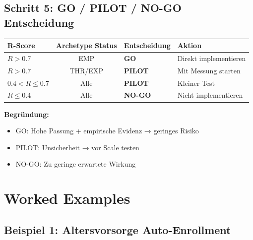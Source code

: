 \subsection{Schritt 5: GO / PILOT / NO-GO Entscheidung}

\begin{tcolorbox}[colback=green!5!white, colframe=green!75!black,
    title=\textbf{Entscheidungsregeln}]

\begin{center}
\renewcommand{\arraystretch}{1.5}
\begin{tabular}{@{}lcll@{}}
\toprule
\textbf{R-Score} & \textbf{Archetype Status} & \textbf{Entscheidung} & \textbf{Aktion} \\
\midrule
$R > 0.7$ & EMP & \cellcolor{green!30}\textbf{GO} & Direkt implementieren \\
$R > 0.7$ & THR/EXP & \cellcolor{yellow!30}\textbf{PILOT} & Mit Messung starten \\
$0.4 < R \leq 0.7$ & Alle & \cellcolor{yellow!30}\textbf{PILOT} & Kleiner Test \\
$R \leq 0.4$ & Alle & \cellcolor{red!30}\textbf{NO-GO} & Nicht implementieren \\
\bottomrule
\end{tabular}
\end{center}

\textbf{Begründung:}
\begin{itemize}[nosep]
\item GO: Hohe Passung + empirische Evidenz → geringes Risiko
\item PILOT: Unsicherheit → vor Scale testen
\item NO-GO: Zu geringe erwartete Wirkung
\end{itemize}

\end{tcolorbox}



\section{Worked Examples}
\label{sec:17-examples}

\subsection{Beispiel 1: Altersvorsorge Auto-Enrollment}
\label{sec:17-example-pension}


